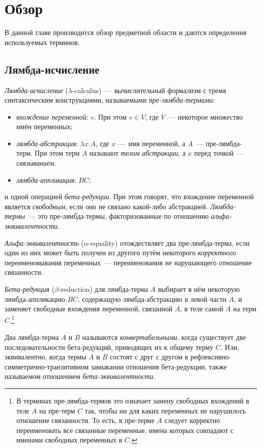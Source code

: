 \chapter{Обзор
}
\label{chapter1}

В данной главе производится обзор предметной области и даются определения используемых терминов.

\section{Лямбда-исчисление}

\emph{Лямбда-исчисление} ($\lambda$-calculus)~--- вычислительный формализм с тремя синтаксическим конструкциями, называемыми \emph{пре-лямбда-термами}:
\begin{itemize}
\item \emph{вхождение переменной}: $v$. При этом $v \in V$, где $V$~--- некоторое множество имён переменных;
\item \emph{лямбда-абстракция}: $\lambda x.A$, где $x$~--- имя переменной, а $A$~--- пре-лямбда-терм. При этом терм $A$ называют \emph{телом абстракции}, а $x$ перед точкой~--- \emph{связыванием}.
\item \emph{лямбда-аппликация}: $B C$;
\end{itemize}
и одной операцией \emph{бета-редукции}.
При этом говорят, что вхождение переменной является \emph{свободным}, если оно не связано какой-либо абстракцией.
\emph{Лямбда-термы}~--- это пре-лямбда-термы, факторизованные по отношению \emph{альфа-эквивалентности}.

\emph{Альфа-эквивалентность} ($\alpha$-equality) отождествляет два пре-лямбда-терма, если один из них может быть получен из другого путём некоторого \emph{корректного} переименовывания переменных~--- переименования не нарушающего отношение связанности.

\emph{Бета-редукция} ($\beta$-reduction) для лямбда-терма $A$ выбирает в нём некоторую лямбда-аппликацию $B C$, содержащую лямбда-абстракцию в левой части $A$, и заменяет свободные вхождения переменной, связанной $A$, в теле самой $A$ на терм $C$.\footnote{В терминах пре-лямбда-термов это означает замену свободных вхождений в теле $A$ на пре-терм $C$ так, чтобы ни для каких переменных не нарушилось отношение связанности. То есть, в пре-терме $A$ следует корректно переименовать все связанные переменные, имена которых совпадают с именами свободных переменных в $C$.}

Два лямбда-терма $A$ и $B$ называются \emph{конвертабельными}, когда существует две последовательности бета-редукций, приводящих их к общему терму $C$.
Или, эквивалентно, когда термы $A$ и $B$ состоят с друг с другом в рефлексивно-симметрично-транзитивном замыкании отношения бета-редукции, также называемом отношением \emph{бета-эквивалентности}.

